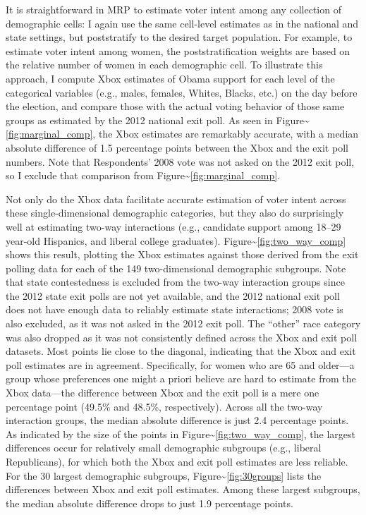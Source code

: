 It is straightforward in MRP to estimate voter intent among any
collection of demographic cells: I again use the same cell-level
estimates as in the national and state settings, but poststratify to the
desired target population. For example, to estimate voter intent among
women, the poststratification weights are based on the relative number
of women in each demographic cell. To illustrate this approach, I
compute Xbox estimates of Obama support for each level of the
categorical variables (e.g., males, females, Whites, Blacks, etc.) on
the day before the election, and compare those with the actual voting
behavior of those same groups as estimated by the 2012 national exit
poll. As seen in Figure\textasciitilde{}\ref{fig:marginal_comp}, the
Xbox estimates are remarkably accurate, with a median absolute
difference of 1.5 percentage points between the Xbox and the exit poll
numbers. Note that Respondents' 2008 vote was not asked on the 2012 exit
poll, so I exclude that comparison from
Figure\textasciitilde{}\ref{fig:marginal_comp}.

Not only do the Xbox data facilitate accurate estimation of voter intent
across these single-dimensional demographic categories, but they also do
surprisingly well at estimating two-way interactions (e.g., candidate
support among 18--29 year-old Hispanics, and liberal college graduates).
Figure\textasciitilde{}\ref{fig:two_way_comp} shows this result,
plotting the Xbox estimates against those derived from the exit polling
data for each of the 149 two-dimensional demographic subgroups. Note
that state contestedness is excluded from the two-way interaction groups
since the 2012 state exit polls are not yet available, and the 2012
national exit poll does not have enough data to reliably estimate state
interactions; 2008 vote is also excluded, as it was not asked in the
2012 exit poll. The ``other'' race category was also dropped as it was
not consistently defined across the Xbox and exit poll datasets. Most
points lie close to the diagonal, indicating that the Xbox and exit poll
estimates are in agreement. Specifically, for women who are 65 and
older---a group whose preferences one might a priori believe are hard to
estimate from the Xbox data---the difference between Xbox and the exit
poll is a mere one percentage point (49.5\% and 48.5\%, respectively).
Across all the two-way interaction groups, the median absolute
difference is just 2.4 percentage points. As indicated by the size of
the points in Figure\textasciitilde{}\ref{fig:two_way_comp}, the largest
differences occur for relatively small demographic subgroups (e.g.,
liberal Republicans), for which both the Xbox and exit poll estimates
are less reliable. For the 30 largest demographic subgroups,
Figure\textasciitilde{}\ref{fig:30groups} lists the differences between
Xbox and exit poll estimates. Among these largest subgroups, the median
absolute difference drops to just 1.9 percentage points.

